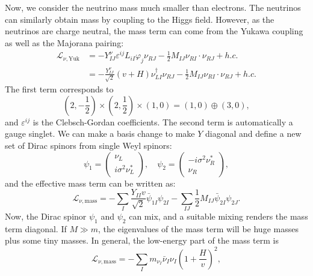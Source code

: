 \documentclass[aps,rmp,twocolumn,superscriptaddress,nofootinbib]{revtex4-2}
\begin{document}
Now, we consider the neutrino mass much smaller than electrons.
The neutrinos can similarly obtain mass by coupling to the Higgs field.
However, as the neutrinos are charge neutral, the mass term can come from the Yukawa coupling as well as the Majorana pairing:
\begin{equation*}
\begin{aligned}
	\mathcal L_{\nu,\mathrm{Yuk}} 
	&= - Y^\nu_{IJ} \varepsilon^{ij} L_{iI} \varphi_j \nu_{RJ} - \frac{1}{2} M_{IJ} \nu_{RI} \cdot \nu_{RJ} + h.c. \\
	&= -\frac{Y^\nu_{IJ}}{\sqrt 2}(v+H) \nu_{LI}^\dagger \nu_{RJ} - \frac{1}{2}M_{IJ}\nu_{RI}\cdot \nu_{RJ} + h.c.
\end{aligned}
\end{equation*}
The first term corresponds to
\begin{equation*}
	\left(2, -\frac{1}{2}\right) \times \left(2, \frac{1}{2}\right) \times \left(1, 0\right) = \left(1,0\right) \oplus(3,0),
\end{equation*}
and $\varepsilon^{ij}$ is the Clebsch-Gordan coefficients.
The second term is automatically a gauge singlet.
We can make a basis change to make $Y$ diagonal and define a new set of Dirac spinors from single Weyl spinors:
\begin{equation}
	\psi_1 = \begin{pmatrix}
		\nu_L \\ i\sigma^2 \nu_L^*
	\end{pmatrix}, \quad
	\psi_2 = \begin{pmatrix}
		-i\sigma^2 \nu_R^* \\ \nu_R
	\end{pmatrix},
\end{equation}
and the effective mass term can be written as:
\begin{equation}
	\mathcal L_{\nu,\mathrm{mass}} 
	= -\sum_I \frac{Y_{II} v}{\sqrt 2}\bar\psi_{1I} \psi_{2I} - \sum_{IJ}\frac{1}{2} M_{IJ} \bar\psi_{2I} \psi_{2J}.
\end{equation}
Now, the Dirac spinor $\psi_1$ and $\psi_2$ can mix, and a suitable mixing renders the mass term diagonal.
If $M \gg m$, the eigenvalues of the mass term will be huge masses plus some tiny masses.
In general, the low-energy part of the mass term is
\begin{equation}
	\mathcal L_{\nu,\mathrm{mass}} = -\sum_I m_{\nu_I}\bar\nu_I \nu_I \left(1+\frac{H}{v}\right)^2,
\end{equation}
\end{document}
